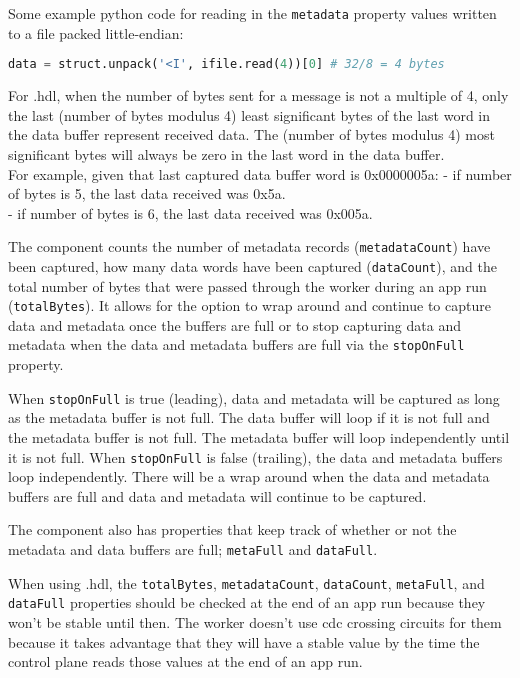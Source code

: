 \begin{flushleft}
Some example python code for reading in the \texttt{metadata} property values written to a file packed little-endian:
    \begin{lstlisting}[language=Python]
    data = struct.unpack('<I', ifile.read(4))[0] # 32/8 = 4 bytes
    \end{lstlisting}


For {\comp}.hdl, when the number of bytes sent for a message is not a multiple of 4, only the
last (number of bytes modulus 4) least significant bytes of the last word
in the data buffer represent received data. The (number of bytes modulus 4)
most significant bytes will always be zero in the last word in the data
buffer. \\
For example, given that last captured data buffer word is 0x0000005a: \newline
- if number of bytes is 5, the last data received was 0x5a. \\
- if number of bytes is 6, the last data received was 0x005a. \newline


The {\comp} component counts the number of metadata records (\texttt{metadataCount}) have been captured, how many data words have been captured (\texttt{dataCount}), and the total number of bytes that were passed through the worker during an app run (\texttt{totalBytes}). It allows for the option to wrap around and continue to capture data and metadata once the buffers are full or to stop capturing data and metadata when the data and metadata buffers are full via the \texttt{stopOnFull} property. \newline

When \texttt{stopOnFull} is true (leading), data and metadata will be captured as long as the metadata buffer is not full. The data buffer will loop if it is not full and the metadata buffer is not full. The metadata buffer will loop independently until it is not full. When \texttt{stopOnFull} is false (trailing), the data and metadata buffers loop independently. There will be a wrap around when the data and metadata buffers are full and data and metadata will continue to be captured.  \newline

The component also has properties that keep track of whether or not the metadata and data buffers are full; \texttt{metaFull} and \texttt{dataFull}. \newline

When using {\comp}.hdl, the \texttt{totalBytes}, \texttt{metadataCount},  \texttt{dataCount}, \texttt{metaFull}, and \texttt{dataFull} properties should be checked at the end of an app run because they won't be stable until then. The worker doesn't use cdc crossing circuits for them because it takes advantage that they will have a stable value by the time the control plane reads those values at the end of an app run.

\end{flushleft}

